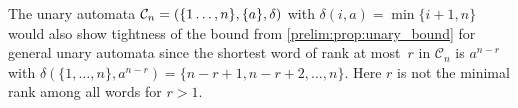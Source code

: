 \begin{remark} \label{prelim:classes:rem:unary-seq-aut}
	The unary automata $\mathcal C_{n} = (\{1\ldots,n\}, \{a\}, \delta)$
	with $\delta(i, a) = \min\{i+1,n\}$
	would also show tightness of the bound from \cref{prelim:prop:unary_bound} for general unary automata
    since the shortest word of rank at most~$r$
	in $\mathcal C_{n}$ is $a^{n - r}$
	with $\delta(\{1,\ldots,n\}, a^{n-r}) = \{n - r + 1, n - r + 2, \ldots, n\}$.
	Here $r$ is not the minimal rank among all words
	for $r > 1$.		
\end{remark}
